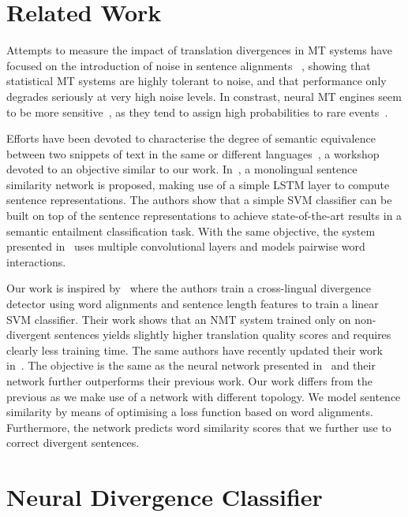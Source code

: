 \documentclass[11pt,a4paper]{article}
\begin{document}
\section{Related Work}
\label{related}

Attempts to measure the impact of translation divergences in MT systems have focused on the introduction of noise in sentence alignments ~\cite{goute2012}, showing that statistical MT systems are highly tolerant to noise, and that performance only degrades seriously at very high noise levels. 
In constrast, neural MT engines seem to be more sensitive~\cite{chen2016adaptation}, as they tend to assign high probabilities to rare events~\cite{Hassan2018AchievingHP}.

Efforts have been devoted to characterise the degree of semantic equivalence between two snippets of text in the same or different languages~\cite{conf/semeval/AgirreBCDGMRW16}, a workshop devoted to an objective similar to our work. 
In~\cite{Mueller:2016:SRA:3016100.3016291}, a monolingual sentence similarity network is proposed, making use of a simple LSTM layer to compute sentence representations. 
The authors show that a simple SVM classifier can be built on top of the sentence representations to achieve state-of-the-art results in a semantic entailment classification task. 
With the same objective, the system presented in~\cite{N16-1108} uses multiple convolutional layers and models pairwise word interactions. %

Our work is inspired by~\cite{W17-3209} where the authors train a cross-lingual divergence detector using word alignments and sentence length features to train a linear SVM classifier. 
Their work shows that an NMT system trained only on non-divergent sentences yields slightly higher translation quality scores and requires clearly less training time. 
The same authors have recently updated their work in~\cite{DBLP:journals/corr/abs-1803-11112}. 
The objective is the same as the neural network presented in~\cite{N16-1108} and their network further outperforms their previous work. 
Our work differs from the previous as we make use of a network with different topology. 
We model sentence similarity by means of optimising a loss function based on word alignments. 
Furthermore, the network predicts word similarity scores that we further use to correct divergent sentences.

\section{Neural Divergence Classifier}
\label{sec:divergence}
\end{document}
